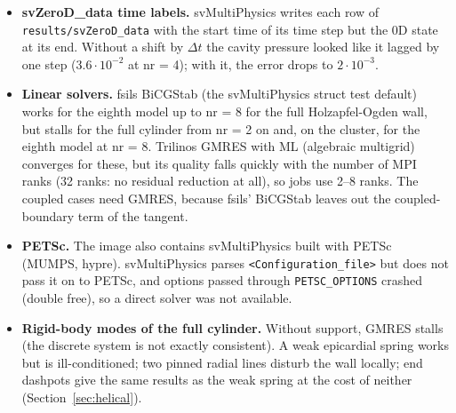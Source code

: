 \begin{itemize}
\item \textbf{svZeroD\_data time labels.} svMultiPhysics writes each row of
\texttt{results/svZeroD\_data} with the start time of its time step but the 0D state at
its end. Without a shift by $\Delta t$ the cavity pressure looked like it lagged by one
step ($3.6\cdot10^{-2}$ at nr = 4); with it, the error drops to $2\cdot10^{-3}$.
\item \textbf{Linear solvers.} fsils BiCGStab (the svMultiPhysics struct test default)
works for the eighth model up to nr = 8 for the full Holzapfel-Ogden wall, but stalls
for the full cylinder from nr = 2 on and, on the cluster, for the eighth model at nr = 8.
Trilinos GMRES with ML (algebraic multigrid) converges for these, but its quality falls
quickly with the number of MPI ranks (32 ranks: no residual reduction at all), so jobs
use 2--8 ranks. The coupled cases need GMRES, because fsils' BiCGStab leaves out the
coupled-boundary term of the tangent.
\item \textbf{PETSc.} The image also contains svMultiPhysics built with PETSc (MUMPS,
hypre). svMultiPhysics parses \texttt{<Configuration\_file>} but does not pass it on
to PETSc, and options passed through \texttt{PETSC\_OPTIONS} crashed (double free), so a
direct solver was not available.
\item \textbf{Rigid-body modes of the full cylinder.} Without support, GMRES stalls
(the discrete system is not exactly consistent). A weak epicardial spring works but is
ill-conditioned; two pinned radial lines disturb the wall locally; end dashpots give the
same results as the weak spring at the cost of neither (Section~\ref{sec:helical}).
\end{itemize}
